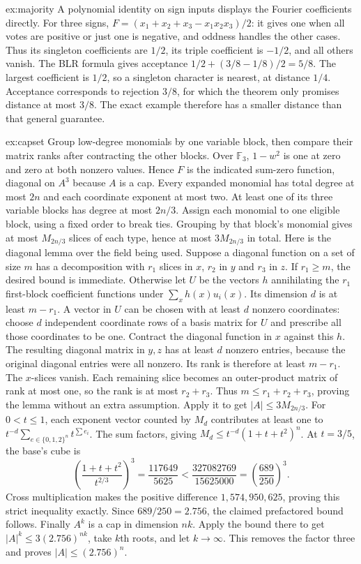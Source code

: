 \begin{solution}{ex:majority}
\idea A polynomial identity on sign inputs displays the Fourier coefficients directly.
\writeup For three signs, $F=(x_1+x_2+x_3-x_1x_2x_3)/2$: it gives one when all votes are positive or just one is negative, and oddness handles the other cases. Thus its singleton coefficients are $1/2$, its triple coefficient is $-1/2$, and all others vanish. The BLR formula gives acceptance $1/2+(3/8-1/8)/2=5/8$. The largest coefficient is $1/2$, so a singleton character is nearest, at distance $1/4$. Acceptance corresponds to rejection $3/8$, for which the theorem only promises distance at most $3/8$. The exact example therefore has a smaller distance than that general guarantee.
\end{solution}

\begin{solution}{ex:capset}
\idea Group low-degree monomials by one variable block, then compare their matrix ranks after contracting the other blocks.
\writeup Over $\mathbb F_3$, $1-w^2$ is one at zero and zero at both nonzero values. Hence $F$ is the indicated sum-zero function, diagonal on $A^3$ because $A$ is a cap. Every expanded monomial has total degree at most $2n$ and each coordinate exponent at most two. At least one of its three variable blocks has degree at most $2n/3$. Assign each monomial to one eligible block, using a fixed order to break ties. Grouping by that block's monomial gives at most $M_{2n/3}$ slices of each type, hence at most $3M_{2n/3}$ in total.
Here is the diagonal lemma over the field being used. Suppose a diagonal function on a set of size $m$ has a decomposition with $r_1$ slices in $x$, $r_2$ in $y$ and $r_3$ in $z$. If $r_1\ge m$, the desired bound is immediate. Otherwise let $U$ be the vectors $h$ annihilating the $r_1$ first-block coefficient functions under $\sum_xh(x)u_i(x)$. Its dimension $d$ is at least $m-r_1$. A vector in $U$ can be chosen with at least $d$ nonzero coordinates: choose $d$ independent coordinate rows of a basis matrix for $U$ and prescribe all those coordinates to be one.
Contract the diagonal function in $x$ against this $h$. The resulting diagonal matrix in $y,z$ has at least $d$ nonzero entries, because the original diagonal entries were all nonzero. Its rank is therefore at least $m-r_1$. The $x$-slices vanish. Each remaining slice becomes an outer-product matrix of rank at most one, so the rank is at most $r_2+r_3$. Thus $m\le r_1+r_2+r_3$, proving the lemma without an extra assumption. Apply it to get $|A|\le3M_{2n/3}$.
For $0<t\le1$, each exponent vector counted by $M_d$ contributes at least one to $t^{-d}\sum_{e\in\{0,1,2\}^n}t^{\sum e_i}$. The sum factors, giving $M_d\le t^{-d}(1+t+t^2)^n$. At $t=3/5$, the base's cube is
\[
\left(\frac{1+t+t^2}{t^{2/3}}\right)^3
=\frac{117649}{5625}
<\frac{327082769}{15625000}=\left(\frac{689}{250}\right)^3.
\]
Cross multiplication makes the positive difference $1{,}574{,}950{,}625$, proving this strict inequality exactly. Since $689/250=2.756$, the claimed prefactored bound follows.
Finally $A^k$ is a cap in dimension $nk$. Apply the bound there to get $|A|^k\le3(2.756)^{nk}$, take $k$th roots, and let $k\to\infty$. This removes the factor three and proves $|A|\le(2.756)^n$.
\end{solution}

